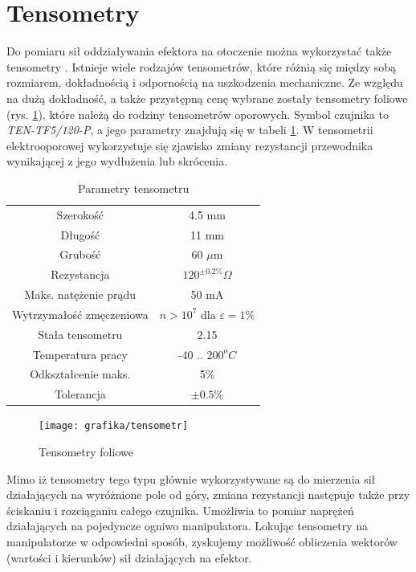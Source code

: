 \documentclass[printmode]{mgr}
\begin{document}
\section{Tensometry}\label{sec:tensometry}
Do pomiaru sił oddziaływania efektora na otoczenie można wykorzystać także tensometry \cite{tensometry}.
Istnieje wiele rodzajów tensometrów, które różnią się między sobą rozmiarem, dokładnością i odpornością na uszkodzenia mechaniczne.
Ze względu na dużą dokładność, a także przystępną cenę wybrane zostały tensometry foliowe (rys. \ref{rys:tensometr}), 
które należą do rodziny tensometrów oporowych. Symbol czujnika to \emph{TEN-TF5/120-P}, a jego parametry znajdują się w tabeli \ref{tab:tensometr}.
W tensometrii elektrooporowej wykorzystuje się zjawisko zmiany rezystancji przewodnika wynikającej z jego wydłużenia lub skrócenia.
\begin{table}[tp]
  \caption{Parametry tensometru}
  \label{tab:tensometr}
  \centering
  \begin{tabular}{||c|c||}
    \hline\hline
Szerokość & 4.5 mm \\
Długość & 11 mm \\
Grubość & 60 $\mu$m \\
Rezystancja & $120^{\pm0.2\%}\Omega$ \\
Maks. natężenie prądu & 50 mA \\
Wytrzymałość zmęczeniowa & $n>10^7$ dla $\varepsilon = 1\%$ \\
Stała tensometru & 2.15 \\
Temperatura pracy & -40 .. $200^o C$ \\
Odkształcenie maks. & 5\% \\
Tolerancja & $\pm 0.5$\% \\ 
\hline\hline
  \end{tabular}
\end{table}

\begin{figure}[tp]
\centering
  \texttt{[image: grafika/tensometr]}
  \caption{Tensometry foliowe}
  \label{rys:tensometr}  
\end{figure}

Mimo iż tensometry tego typu głównie wykorzystywane są do mierzenia sił działających na wyróżnione pole od góry, zmiana rezystancji 
następuje także przy ściskaniu i rozciąganiu całego czujnika. Umożliwia to pomiar naprężeń działających na pojedyncze ogniwo
manipulatora. Lokując tensometry na manipulatorze w odpowiedni sposób, zyskujemy możliwość obliczenia wektorów (wartości i kierunków)
sił działających na efektor.
\end{document}
